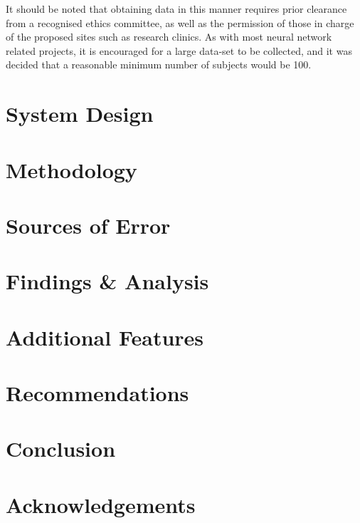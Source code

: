 \documentclass[conference]{IEEEtran}
\begin{document}
It should be noted that obtaining data in this manner requires prior clearance from a recognised ethics committee, as well as the permission of those in charge of the proposed sites such as research clinics.
As with most neural network related projects, it is encouraged for a large data-set to be collected, and it was decided that a reasonable minimum number of subjects would be 100.


\section{System Design}

\section{Methodology}

\section{Sources of Error}

\section{Findings \& Analysis}

\section{Additional Features}

\section{Recommendations}

\section{Conclusion}

\section{Acknowledgements}



\end{document}
